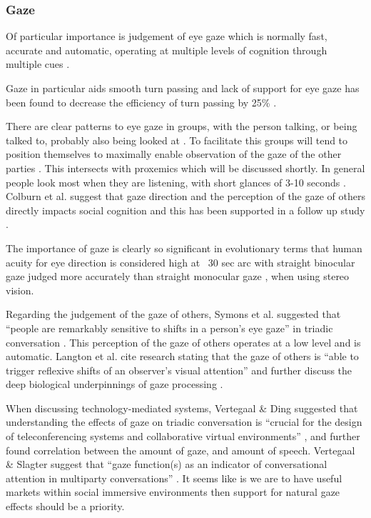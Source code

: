 \subsubsection{Gaze}
Of particular importance is judgement of eye gaze which is normally fast, accurate and automatic, operating at multiple levels of cognition through multiple cues \cite{Argyle1988,Argyle1976,Argyle1965,Argyle1976,Argyle1969, Kendon1967,Monk2002}.\par
Gaze in particular aids smooth turn passing \cite{Hedge1978} \cite{Novick1996} and lack of support for eye gaze has been found to decrease the efficiency of turn passing by 25\% \cite{Vertegaal2000}.\par
There are clear patterns to eye gaze in groups, with the person talking, or being talked to, probably also being looked at \cite{Vertegaal2001} \cite{Langton2000}. To facilitate this groups will tend to position themselves to maximally enable observation of the gaze of the other parties \cite{Kendon1967}. This intersects with proxemics which will be discussed shortly.  In general people look most when they are listening, with short glances of 3-10 seconds \cite{Argyle1965}. %
Colburn et al. suggest that gaze direction and the perception of the gaze of others directly impacts social cognition \cite{Colburn2000} and this has been supported in a follow up study \cite{Macrae2002}.\par
The importance of gaze is clearly so significant in evolutionary terms that human acuity for eye direction is considered high at ~30 sec arc \cite{Symons2004} with straight binocular gaze judged more accurately than straight monocular gaze \cite{Kluttz2009}, when using stereo vision. \par
Regarding the judgement of the gaze of others, Symons et al. suggested that ``people are remarkably sensitive to shifts in a person's eye gaze'' in triadic conversation \cite{Symons2004}. 
This perception of the gaze of others operates at a low level and is automatic. Langton et al. cite research stating that the gaze of others is ``able to trigger reflexive shifts of an observer's visual attention'' and further discuss the deep biological underpinnings of gaze processing \cite{Langton2000}. \par  
When discussing technology-mediated systems, Vertegaal \& Ding suggested that understanding the effects of gaze on triadic conversation is ``crucial for the design of teleconferencing systems and collaborative virtual environments'' \cite{Vertegaal2002}, and further found correlation between the amount of gaze, and amount of speech. Vertegaal \& Slagter suggest that ``gaze function(s) as an indicator of conversational attention in multiparty conversations'' \cite{Vertegaal2001}. It seems like is we are to have useful markets within social immersive environments then support for natural gaze effects should be a priority.\par  
